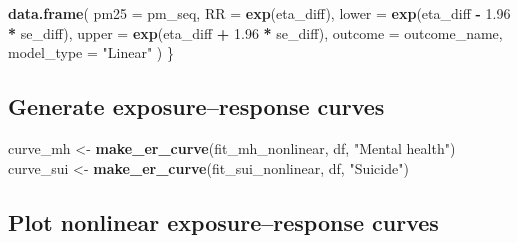 \documentclass[
]{article}
\newenvironment{Shaded}{\begin{snugshade}}{\end{snugshade}}
\newcommand{\AttributeTok}[1]{\textcolor[rgb]{0.13,0.29,0.53}{#1}}
\newcommand{\FloatTok}[1]{\textcolor[rgb]{0.00,0.00,0.81}{#1}}
\newcommand{\FunctionTok}[1]{\textcolor[rgb]{0.13,0.29,0.53}{\textbf{#1}}}
\newcommand{\NormalTok}[1]{#1}
\newcommand{\OtherTok}[1]{\textcolor[rgb]{0.56,0.35,0.01}{#1}}
\newcommand{\SpecialCharTok}[1]{\textcolor[rgb]{0.81,0.36,0.00}{\textbf{#1}}}
\newcommand{\StringTok}[1]{\textcolor[rgb]{0.31,0.60,0.02}{#1}}
\begin{document}
\begin{Shaded}
\begin{Highlighting}[]
  \FunctionTok{data.frame}\NormalTok{(}
    \AttributeTok{pm25 =}\NormalTok{ pm\_seq,}
    \AttributeTok{RR =} \FunctionTok{exp}\NormalTok{(eta\_diff),}
    \AttributeTok{lower =} \FunctionTok{exp}\NormalTok{(eta\_diff }\SpecialCharTok{{-}} \FloatTok{1.96} \SpecialCharTok{*}\NormalTok{ se\_diff),}
    \AttributeTok{upper =} \FunctionTok{exp}\NormalTok{(eta\_diff }\SpecialCharTok{+} \FloatTok{1.96} \SpecialCharTok{*}\NormalTok{ se\_diff),}
    \AttributeTok{outcome =}\NormalTok{ outcome\_name,}
    \AttributeTok{model\_type =} \StringTok{"Linear"}
\NormalTok{  )}
\NormalTok{\}}
\end{Highlighting}
\end{Shaded}

\subsection{Generate exposure--response
curves}\label{generate-exposureresponse-curves}

\begin{Shaded}
\begin{Highlighting}[]
\NormalTok{curve\_mh  }\OtherTok{\textless{}{-}} \FunctionTok{make\_er\_curve}\NormalTok{(fit\_mh\_nonlinear, df, }\StringTok{"Mental health"}\NormalTok{)}
\NormalTok{curve\_sui }\OtherTok{\textless{}{-}} \FunctionTok{make\_er\_curve}\NormalTok{(fit\_sui\_nonlinear, df, }\StringTok{"Suicide"}\NormalTok{)}
\end{Highlighting}
\end{Shaded}

\subsection{Plot nonlinear exposure--response
curves}\label{plot-nonlinear-exposureresponse-curves}
\end{document}
